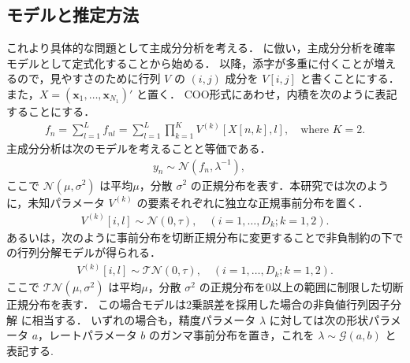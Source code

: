 \documentclass[paper=a4,10.5pt]{jsarticle} %
\numberwithin{equation}{section} %
\begin{document}
\subsection{モデルと推定方法}
\label{sec:pca}
これより具体的な問題として主成分分析を考える．\cite{tipping1999probabilistic} に倣い，主成分分析を確率モデルとして定式化することから始める．
以降，添字が多重に付くことが増えるので，見やすさのために行列 $V$ の $(i,j)$ 成分を $V[i,j]$ と書くことにする．また，$X=(\boldsymbol{x}_1, \ldots, \boldsymbol{x}_{N_1})'$ と置く． 
 COO形式にあわせ，内積を次のように表記することにする．
\begin{align}
 f_n = \sum_{l=1}^{L} f_{nl} = \sum_{l=1}^{L} \prod_{k=1}^K V^{(k)} [X[n, k], l], \quad \mbox{where $K=2$.}
\end{align}
主成分分析は次のモデルを考えることと等価である．
\begin{align}
y_n \sim \mathcal{N}\left(f_n , \lambda^{-1} \right) ,  \quad  \label{mod1}
\end{align}
ここで $\mathcal{N}(\mu, \sigma^2)$ は平均$\mu$，分散 $\sigma^2$ の正規分布を表す．本研究では次のように，未知パラメータ $V^{(k)}$ の要素それぞれに独立な正規事前分布を置く．
\begin{align}
V^{(k)}[i,l] \sim \mathcal{N}(0, \tau), \quad (i=1,\ldots, D_k; k=1,2). 
\end{align}
あるいは，次のように事前分布を切断正規分布に変更することで非負制約の下での行列分解モデルが得られる．
\begin{align}
V^{(k)}[i,l] \sim \mathcal{TN}(0, \tau), \quad (i=1,\ldots, D_k; k=1,2). 
\end{align}
ここで $\mathcal{TN}(\mu, \sigma^2)$ は平均$\mu$，分散 $\sigma^2$ の正規分布を0以上の範囲に制限した切断正規分布を表す．
この場合モデルは2乗誤差を採用した場合の非負値行列因子分解 \citep{lee2000algorithms} に相当する．
いずれの場合も，精度パラメータ $\lambda$ に対しては次の形状パラメータ $a$，レートパラメータ $b$ のガンマ事前分布を置き，これを $\lambda \sim \mathcal{G}(a, b)$ と表記する. 
\end{document}
